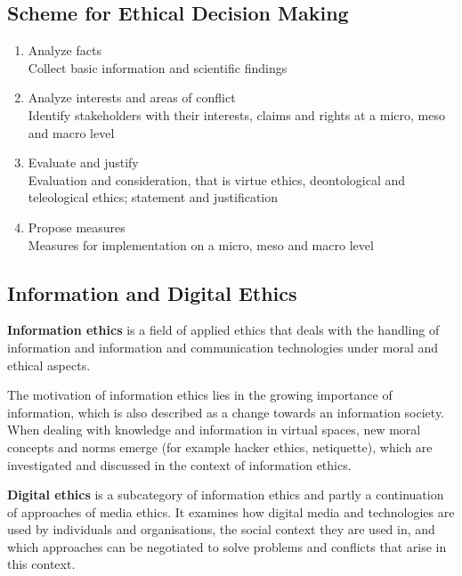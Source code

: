 \documentclass[11pt]{article}
\theoremstyle{definition}
\begin{document}
\subsection{Scheme for Ethical Decision Making}
\begin{enumerate}
	\item Analyze facts\\
	Collect basic information and scientific findings
	\item Analyze interests and areas of conflict\\
	Identify stakeholders with their interests, claims and rights at a micro, meso and macro level
	\item Evaluate and justify\\
	Evaluation and consideration, that is virtue ethics, deontological and teleological ethics; statement and justification
	\item Propose measures\\
	Measures for implementation on a micro, meso and macro level
\end{enumerate}

\subsection{Information and Digital Ethics}
\begin{definition}
	\textbf{Information ethics} is a field of applied ethics that deals with the handling of information and information and communication technologies under moral and ethical aspects.
\end{definition}

The motivation of information ethics lies in the growing importance of information, which is also described as a change towards an information society. When dealing with knowledge and information in virtual spaces, new moral concepts and norms emerge (for example hacker ethics, netiquette), which are investigated and discussed in the context of information ethics.

\begin{definition}
	\textbf{Digital ethics} is a subcategory of information ethics and partly a continuation of approaches of media ethics. It examines how digital media and technologies are used by individuals and organisations, the social context they are used in, and which approaches can be negotiated to solve problems and conflicts that arise in this context.
\end{definition}
\end{document}
